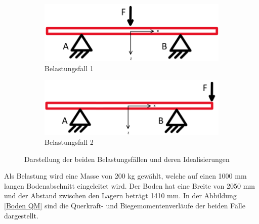 \begin{figure}[!ht]
  \centering
    \begin{subfigure}{.5\textwidth}
      \centering
      \includegraphics[width=.98\linewidth]{04_figures/Boden Fall1.png}
      \caption{Belastungsfall 1}
      \label{Belastungsfall 1}
    \end{subfigure}%
    \begin{subfigure}{.5\textwidth}
      \centering
      \includegraphics[width=.98\linewidth]{04_figures/Boden Fall2.png}
      \caption{Belastungsfall 2}
      \label{Belastungsfall 2}
    \end{subfigure}%
  \caption{Darstellung der beiden Belastungsfällen und deren Idealisierungen}
\label{Boden Idealisierung}
\end{figure}

Als Belastung wird eine Masse von 200 kg gewählt, welche auf einen 1000 mm langen Bodenabschnitt eingeleitet wird. Der Boden hat eine Breite von 2050 mm und der Abstand zwischen den Lagern beträgt 1410 mm. In der Abbildung \ref{Boden QM} sind die Querkraft- und Biegemomentenverläufe der beiden Fälle dargestellt.

